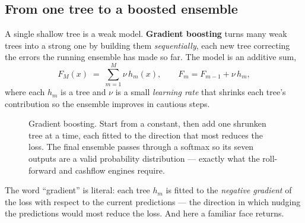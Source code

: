 \documentclass[11pt]{article}
\newcommand{\softmax}{\operatorname{softmax}}
\begin{document}
\subsection{From one tree to a boosted ensemble}

A single shallow tree is a weak model. \textbf{Gradient boosting} turns many weak trees into a
strong one by building them \emph{sequentially}, each new tree correcting the errors the running
ensemble has made so far. The model is an additive sum,
\begin{equation}
  F_M(x) \;=\; \sum_{m=1}^{M} \nu\, h_m(x),
  \qquad
  F_m = F_{m-1} + \nu\, h_m,
  \label{eq:boost}
\end{equation}
where each $h_m$ is a tree and $\nu$ is a small \emph{learning rate} that shrinks each tree's
contribution so the ensemble improves in cautious steps.

\begin{figure}[H]
\centering
{}
\caption{Gradient boosting. Start from a constant, then add one shrunken tree at a time, each
fitted to the direction that most reduces the loss. The final ensemble passes through a softmax
so its seven outputs are a valid probability distribution --- exactly what the roll-forward and
cashflow engines require.}
\end{figure}

The word ``gradient'' is literal: each tree $h_m$ is fitted to the \emph{negative gradient} of
the loss with respect to the current predictions --- the direction in which nudging the
predictions would most reduce the loss. And here a familiar face returns.
\end{document}
